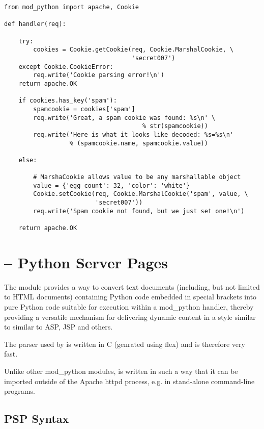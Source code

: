 \begin{verbatim}
from mod_python import apache, Cookie

def handler(req):
    
    try:
        cookies = Cookie.getCookie(req, Cookie.MarshalCookie, \
                                   'secret007')
    except Cookie.CookieError:
        req.write('Cookie parsing error!\n')
	return apache.OK

    if cookies.has_key('spam'):
        spamcookie = cookies['spam']
        req.write('Great, a spam cookie was found: %s\n' \
                                      % str(spamcookie))
        req.write('Here is what it looks like decoded: %s=%s\n'
                  % (spamcookie.name, spamcookie.value))

    else:

        # MarshaCookie allows value to be any marshallable object
        value = {'egg_count': 32, 'color': 'white'}
        Cookie.setCookie(req, Cookie.MarshalCookie('spam', value, \
                         'secret007'))
        req.write('Spam cookie not found, but we just set one!\n')

    return apache.OK
\end{verbatim}

\section{ -- Python Server Pages\label{pyapi-psp}}
\modulesynopsis{Python Server Pages}

The  module provides a way to convert text documents
(including, but not limited to HTML documents) containing Python code
embedded in special brackets into pure Python code suitable for
execution within a mod_python handler, thereby providing a versatile
mechanism for delivering dynamic content in a style similar to similar
to ASP, JSP and others.

The parser used by  is written in C (genrated using flex)
and is therefore very fast.

Unlike other mod_python modules,  is written in such a way
that it can be imported outside of the Apache httpd process, e.g. in
stand-alone command-line programs.

\subsection{PSP Syntax\label{pyapi-psp-syntax}}

